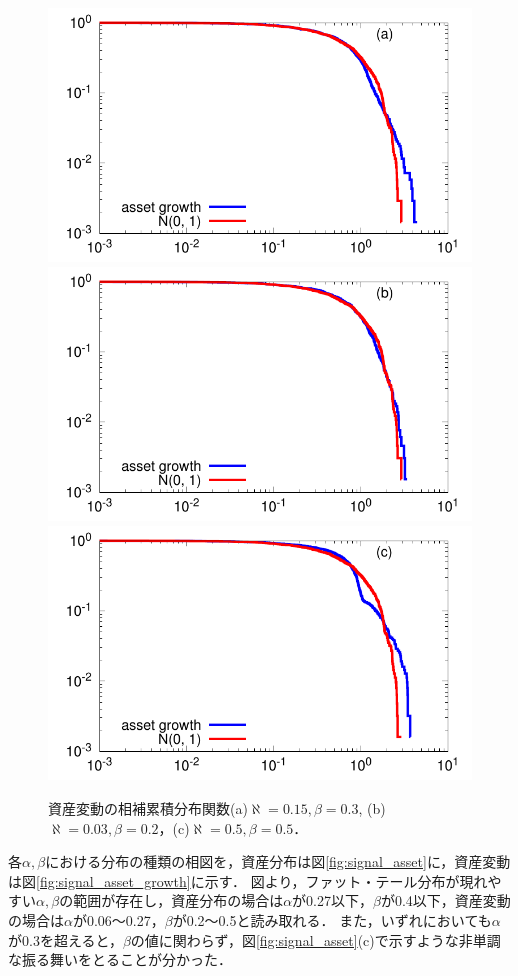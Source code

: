 \documentclass[titlepage]{jsreport}
\begin{document}
\begin{figure}[htbp]
    \centering
    \includegraphics[width=0.7\linewidth]{fig/asset_growth_a015_b03.pdf}
    \includegraphics[width=0.7\linewidth]{fig/asset_growth_a003_b02.pdf}
    \includegraphics[width=0.7\linewidth]{fig/asset_growth_a05_b05.pdf}
    \caption{資産変動の相補累積分布関数(a)$\aleph = 0.15, \beta = 0.3$, (b)$\aleph = 0.03, \beta = 0.2$，(c)$\aleph = 0.5, \beta = 0.5$．}
    \label{fig:model_asset_growth_survival}
\end{figure}


各$\alpha, \beta$における分布の種類の相図を，資産分布は図\ref{fig:signal_asset}に，資産変動は図\ref{fig:signal_asset_growth}に示す．
図より，ファット・テール分布が現れやすい$\alpha, \beta$の範囲が存在し，資産分布の場合は$\alpha$が0.27以下，$\beta$が0.4以下，資産変動の場合は$\alpha$が0.06～0.27，$\beta$が0.2～0.5と読み取れる．
また，いずれにおいても$\alpha$が0.3を超えると，$\beta$の値に関わらず，図\ref{fig:signal_asset}(c)で示すような非単調な振る舞いをとることが分かった．
\end{document}
